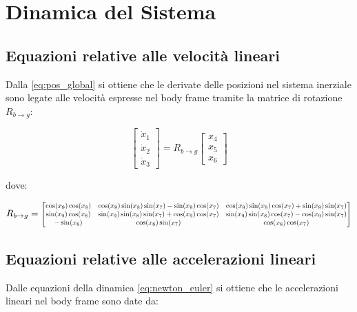 \section{Dinamica del Sistema}

\subsection{Equazioni relative alle velocità lineari}
     
Dalla \ref{eq:pos_global} si ottiene che le derivate delle posizioni nel sistema inerziale 
sono legate alle velocità espresse nel body frame tramite la matrice di rotazione $R_{b \to g}$:

\begin{equation}
	\begin{bmatrix}
		\dot{x}_1 \\
		\dot{x}_2 \\
		\dot{x}_3
		\end{bmatrix}
		=
		R_{b \to g}
		\begin{bmatrix}
		x_4 \\
		x_5 \\
		x_6
	\end{bmatrix}
\end{equation}

dove: 

\begin{equation}
	R_{b \to g} =
	\resizebox{0.96\textwidth}{!}{$
	\begin{bmatrix}
		\cos(x_9)\cos(x_8) & \cos(x_9)\sin(x_8)\sin(x_7) - \sin(x_9)\cos(x_7) & \cos(x_9)\sin(x_8)\cos(x_7) + \sin(x_9)\sin(x_7) \\
		\sin(x_9)\cos(x_8) & \sin(x_9)\sin(x_8)\sin(x_7) + \cos(x_9)\cos(x_7) & \sin(x_9)\sin(x_8)\cos(x_7) - \cos(x_9)\sin(x_7) \\
		-\sin(x_8) & \cos(x_8)\sin(x_7) & \cos(x_8)\cos(x_7)
	\end{bmatrix}
	$}
\end{equation}

     
\clearpage

\subsection{Equazioni relative alle accelerazioni lineari}

Dalle equazioni della dinamica \ref{eq:newton_euler} si ottiene che le accelerazioni lineari nel body frame 
sono date da:

